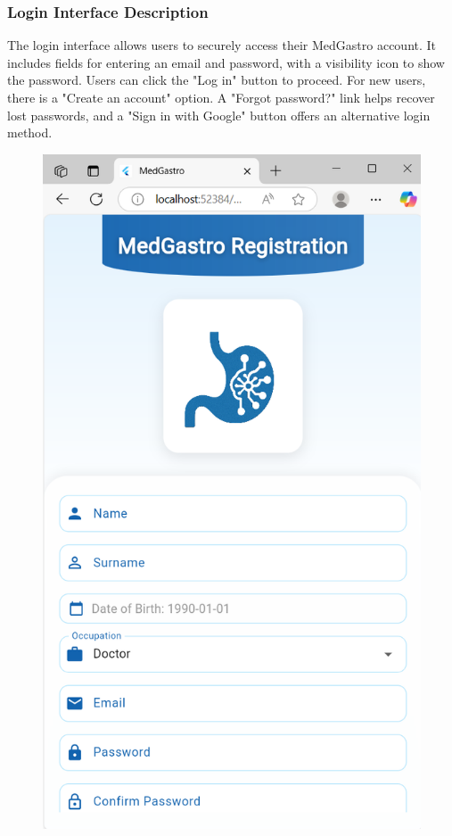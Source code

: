 \documentclass[12pt,a4paper]{report}
\begin{document}
\subsubsection{Login Interface Description}
The login interface allows users to securely access their MedGastro account. It includes fields for entering an email and password, with a visibility icon to show the password. Users can click the "Log in" button to proceed. For new users, there is a "Create an account" option. A "Forgot password?" link helps recover lost passwords, and a "Sign in with Google" button offers an alternative login method.

\begin{figure}[H]
    \centering
    \begin{minipage}{0.48\textwidth}
        \centering
        \includegraphics[width=\linewidth]{i2a.png}

\end{minipage}
\end{figure}
\end{document}
